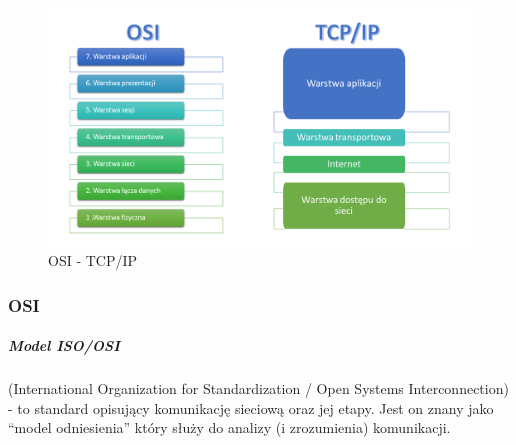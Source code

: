 \documentclass[a4paper,12pt,oneside]{book}
\begin{document}
				\begin{figure}[h!]
					\centering\includegraphics[scale=0.45]{osi-tcp.png}
					\caption{OSI - TCP/IP}
				\end{figure}
				\subsubsection{OSI}
				\subparagraph{Model ISO/OSI} (International Organization for Standardization / Open Systems
				Interconnection) - to standard opisujący komunikację sieciową oraz jej etapy. Jest on znany
				jako “model odniesienia” który służy do analizy (i zrozumienia) komunikacji.
				
\end{document}

